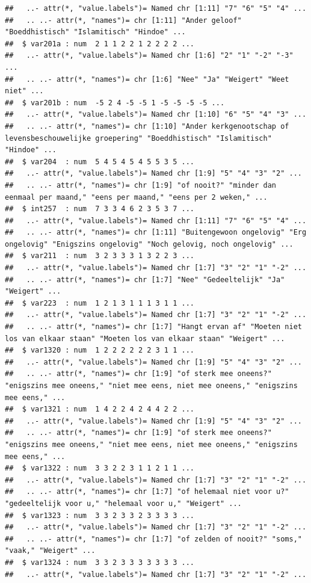 \documentclass[
]{book}
\begin{document}
\begin{verbatim}
##   ..- attr(*, "value.labels")= Named chr [1:11] "7" "6" "5" "4" ...
##   .. ..- attr(*, "names")= chr [1:11] "Ander geloof" "Boeddhistisch" "Islamitisch" "Hindoe" ...
##  $ var201a : num  2 1 1 2 2 1 2 2 2 2 ...
##   ..- attr(*, "value.labels")= Named chr [1:6] "2" "1" "-2" "-3" ...
##   .. ..- attr(*, "names")= chr [1:6] "Nee" "Ja" "Weigert" "Weet niet" ...
##  $ var201b : num  -5 2 4 -5 -5 1 -5 -5 -5 -5 ...
##   ..- attr(*, "value.labels")= Named chr [1:10] "6" "5" "4" "3" ...
##   .. ..- attr(*, "names")= chr [1:10] "Ander kerkgenootschap of levensbeschouwelijke groepering" "Boeddhistisch" "Islamitisch" "Hindoe" ...
##  $ var204  : num  5 4 5 4 5 4 5 5 3 5 ...
##   ..- attr(*, "value.labels")= Named chr [1:9] "5" "4" "3" "2" ...
##   .. ..- attr(*, "names")= chr [1:9] "of nooit?" "minder dan eenmaal per maand," "eens per maand," "eens per 2 weken," ...
##  $ int257  : num  7 3 3 4 6 2 3 5 3 7 ...
##   ..- attr(*, "value.labels")= Named chr [1:11] "7" "6" "5" "4" ...
##   .. ..- attr(*, "names")= chr [1:11] "Buitengewoon ongelovig" "Erg ongelovig" "Enigszins ongelovig" "Noch gelovig, noch ongelovig" ...
##  $ var211  : num  3 2 3 3 3 1 3 2 2 3 ...
##   ..- attr(*, "value.labels")= Named chr [1:7] "3" "2" "1" "-2" ...
##   .. ..- attr(*, "names")= chr [1:7] "Nee" "Gedeeltelijk" "Ja" "Weigert" ...
##  $ var223  : num  1 2 1 3 1 1 1 3 1 1 ...
##   ..- attr(*, "value.labels")= Named chr [1:7] "3" "2" "1" "-2" ...
##   .. ..- attr(*, "names")= chr [1:7] "Hangt ervan af" "Moeten niet los van elkaar staan" "Moeten los van elkaar staan" "Weigert" ...
##  $ var1320 : num  1 2 2 2 2 2 2 3 1 1 ...
##   ..- attr(*, "value.labels")= Named chr [1:9] "5" "4" "3" "2" ...
##   .. ..- attr(*, "names")= chr [1:9] "of sterk mee oneens?" "enigszins mee oneens," "niet mee eens, niet mee oneens," "enigszins mee eens," ...
##  $ var1321 : num  1 4 2 2 4 2 4 4 2 2 ...
##   ..- attr(*, "value.labels")= Named chr [1:9] "5" "4" "3" "2" ...
##   .. ..- attr(*, "names")= chr [1:9] "of sterk mee oneens?" "enigszins mee oneens," "niet mee eens, niet mee oneens," "enigszins mee eens," ...
##  $ var1322 : num  3 3 2 2 3 1 1 2 1 1 ...
##   ..- attr(*, "value.labels")= Named chr [1:7] "3" "2" "1" "-2" ...
##   .. ..- attr(*, "names")= chr [1:7] "of helemaal niet voor u?" "gedeeltelijk voor u," "helemaal voor u," "Weigert" ...
##  $ var1323 : num  3 3 2 3 3 2 3 3 3 3 ...
##   ..- attr(*, "value.labels")= Named chr [1:7] "3" "2" "1" "-2" ...
##   .. ..- attr(*, "names")= chr [1:7] "of zelden of nooit?" "soms," "vaak," "Weigert" ...
##  $ var1324 : num  3 3 2 3 3 3 3 3 3 3 ...
##   ..- attr(*, "value.labels")= Named chr [1:7] "3" "2" "1" "-2" ...

\end{verbatim}
\end{document}
